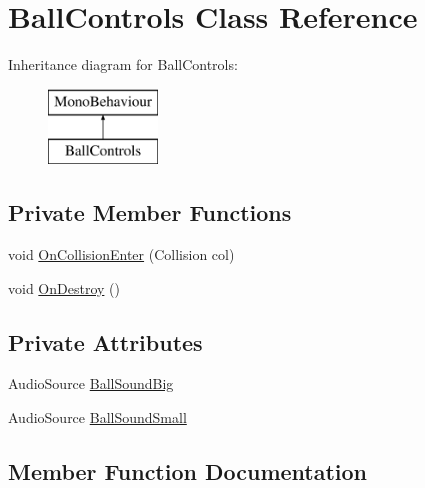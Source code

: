 \hypertarget{class_ball_controls}{}\section{Ball\+Controls Class Reference}
\label{class_ball_controls}
Inheritance diagram for Ball\+Controls\+:\begin{figure}[H]
\begin{center}
\leavevmode
\includegraphics[height=2.000000cm]{class_ball_controls}
\end{center}
\end{figure}
\subsection*{Private Member Functions}
\begin{DoxyCompactItemize}
\item 
void \mbox{\hyperlink{class_ball_controls_afc951b5708e1230db03a9333c09a078a}{On\+Collision\+Enter}} (Collision col)
\item 
void \mbox{\hyperlink{class_ball_controls_a00d79b184e3653f025568ac5a9aeba20}{On\+Destroy}} ()
\end{DoxyCompactItemize}
\subsection*{Private Attributes}
\begin{DoxyCompactItemize}
\item 
Audio\+Source \mbox{\hyperlink{class_ball_controls_a8b478ef0dc12f8683cfdd7e485ee9d20}{Ball\+Sound\+Big}}
\item 
Audio\+Source \mbox{\hyperlink{class_ball_controls_acd4d5b722bd7ad4fd32d6df3cd9b5191}{Ball\+Sound\+Small}}
\end{DoxyCompactItemize}


\subsection{Member Function Documentation}
\mbox{\label{class_ball_controls_afc951b5708e1230db03a9333c09a078a}} 
